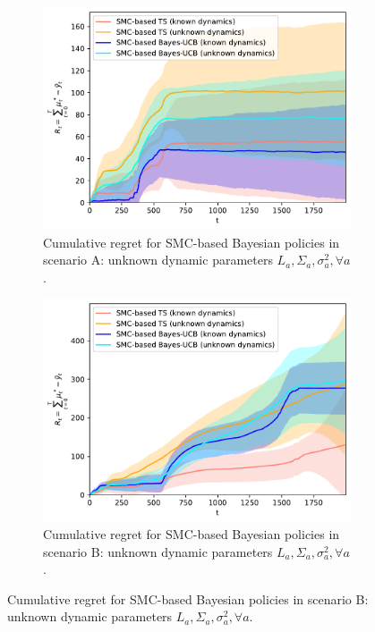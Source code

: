 \begin{figure}[!h]
	\begin{subfigure}[b]{0.47\textwidth}
		\includegraphics[width=\textwidth]{./fods_figs/dynamic/linearGaussian/a_M2000_cumulative_regret_dunknown}
		\caption{Cumulative regret for SMC-based Bayesian policies in scenario A: unknown dynamic parameters $L_a,\Sigma_a,\sigma_a^2, \forall a$.}
		\label{fig:dynamic_bandits_linearGaussian_a_cstatic_dunknown}
	\end{subfigure}\qquad
	\begin{subfigure}[b]{0.47\textwidth}
		\includegraphics[width=\textwidth]{./fods_figs/dynamic/linearGaussian/b_M2000_cumulative_regret_dunknown}
		\caption{Cumulative regret for SMC-based Bayesian policies in scenario B: unknown dynamic parameters $L_a,\Sigma_a,\sigma_a^2, \forall a$.}
		\label{fig:dynamic_bandits_linearGaussian_b_cstatic_dunknown}

\end{subfigure}
\end{figure}
